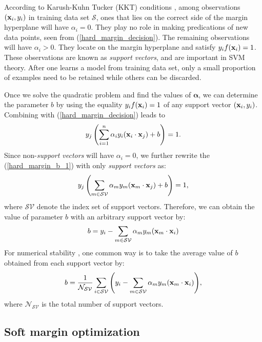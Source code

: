 \documentclass[english]{tktltiki}
\newcommand{\Ncal}{\mathcal{N}} %
\newcommand{\Scal}{\mathcal{S}}
\newcommand{\xb}{{\bf x}}
\newcommand{\valpha}{\mathbf{\alpha}}
\newcommand{\SVcal}{\mathcal{SV}}
\begin{document}
According to Karush-Kuhn Tucker (KKT) conditions \cite{kuhn50}, among observations $(\xb_i, y_i)$ in training data set $\Scal$, ones that lies on the correct side of the margin hyperplane will have $\alpha_i = 0$. They play no role in making predications of new data points, seen from (\ref{hard_margin_decision}). The remaining observations will have $\alpha_i > 0$. They locate on the margin hyperplane and satisfy $y_if(\xb_i) = 1$. These observations are known as {\em support vectors}, and are important in SVM theory. After one learns a model from training data set, only a small proportion of examples need to be retained while others can be discarded.


Once we solve the quadratic problem and find the values of $\valpha$, we can determine the parameter $b$ by using the equality $y_if(\xb_i) = 1$ of any support vector $(\xb_i, y_i)$. Combining with (\ref{hard_margin_decision}) leads to
\begin{align}
y_j\left(\sum_{i = 1}^{n}{\alpha_i y_i (\xb_i \cdot \xb_j)} + b\right) = 1.
\label{hard_margin_b_1}
\end{align}
Since non-{\em support vectors} will have $\alpha_i = 0$, we further rewrite the (\ref{hard_margin_b_1}) with only {\em support vectors} as:
\begin{align}
y_j\left(\sum_{m \in \SVcal}{\alpha_m y_m (\xb_m \cdot \xb_j)} + b\right) = 1,
\label{hard_margin_b_2}
\end{align}
where $\SVcal$ denote the index set of support vectors. Therefore, we can obtain the value of parameter $b$ with an arbitrary support vector by:
\begin{align*}
b = y_i - \sum_{m \in \SVcal}{\alpha_m y_m (\xb_m \cdot \xb_i)}
\end{align*}
For numerical stability \cite{higham96}, one common way is to take the average value of $b$ obtained from each support vector by:
\begin{align*}
b = \frac{1}{\Ncal_{\SVcal}}\sum_{i \in \SVcal}{\left(y_i - \sum_{m \in \SVcal}{\alpha_m y_m (\xb_m \cdot \xb_i)}\right)},
\end{align*}
where $\Ncal_{\SVcal}$ is the total number of support vectors.


\subsection{Soft margin optimization}

\end{document}
